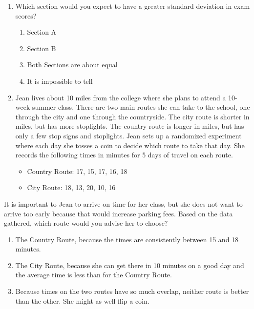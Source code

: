 \documentclass[11pt]{umnthesis}
\begin{document}
\begin{enumerate}
\def\labelenumi{\arabic{enumi}.}
\setcounter{enumi}{6}
\item
  Which section would you expect to have a greater standard deviation in exam scores?

  \begin{enumerate}
  \def\labelenumii{\alph{enumii}.}
  \tightlist
  \item
    Section A
  \item
    Section B
  \item
    Both Sections are about equal
  \item
    It is impossible to tell
  \end{enumerate}
\item
  Jean lives about 10 miles from the college where she plans to attend a 10-week summer class. There are two main routes she can take to the school, one through the city and one through the countryside. The city route is shorter in miles, but has more stoplights. The country route is longer in miles, but has only a few stop signs and stoplights. Jean sets up a randomized experiment where each day she tosses a coin to decide which route to take that day. She records the following times in minutes for 5 days of travel on each route.

  \begin{itemize}
  \tightlist
  \item
    Country Route: 17, 15, 17, 16, 18
  \item
    City Route: 18, 13, 20, 10, 16
  \end{itemize}
\end{enumerate}

It is important to Jean to arrive on time for her class, but she does not want to arrive too early because that would increase parking fees. Based on the data gathered, which route would you advise her to choose?

\begin{enumerate}
\def\labelenumi{\alph{enumi}.}
\tightlist
\item
  The Country Route, because the times are consistently between 15 and 18 minutes.
\item
  The City Route, because she can get there in 10 minutes on a good day and the average time is less than for the Country Route.
\item
  Because times on the two routes have so much overlap, neither route is better than the other. She might as well flip a coin.
\end{enumerate}
\end{document}
